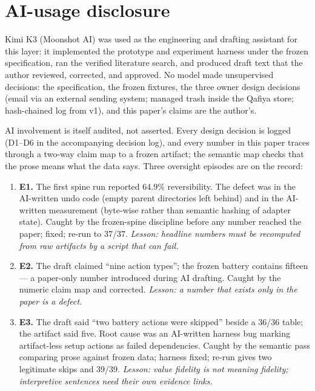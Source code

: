 \documentclass[11pt]{article}
\begin{document}
\section{AI-usage disclosure}

Kimi K3 (Moonshot AI) was used as the engineering and drafting assistant for this
layer: it implemented the prototype and experiment harness under the frozen
specification, ran the verified literature search, and produced draft text that
the author reviewed, corrected, and approved. No model made unsupervised
decisions: the specification, the frozen fixtures, the three owner design
decisions (email via an external sending system; managed trash inside the Qafiya
store; hash-chained log from v1), and this paper's claims are the author's.

AI involvement is itself audited, not asserted. Every design decision is logged
(D1--D6 in the accompanying decision log), and every number in this paper traces
through a two-way claim map to a frozen artifact; the semantic map checks that
the prose means what the data says. Three oversight episodes are on the record:

\begin{enumerate}[nosep]
  \item \textbf{E1.} The first spine run reported 64.9\% reversibility. The
        defect was in the AI-written undo code (empty parent directories left
        behind) and in the AI-written measurement (byte-wise rather than
        semantic hashing of adapter state). Caught by the frozen-spine
        discipline before any number reached the paper; fixed; re-run to
        37/37. \emph{Lesson: headline numbers must be recomputed from raw
        artifacts by a script that can fail.}
  \item \textbf{E2.} The draft claimed ``nine action types''; the frozen battery
        contains fifteen --- a paper-only number introduced during AI drafting.
        Caught by the numeric claim map and corrected. \emph{Lesson: a number
        that exists only in the paper is a defect.}
  \item \textbf{E3.} The draft said ``two battery actions were skipped'' beside
        a 36/36 table; the artifact said five. Root cause was an AI-written
        harness bug marking artifact-less setup actions as failed dependencies.
        Caught by the semantic pass comparing prose against frozen data; harness
        fixed; re-run gives two legitimate skips and 39/39. \emph{Lesson: value
        fidelity is not meaning fidelity; interpretive sentences need their own
        evidence links.}
\end{enumerate}
\end{document}

